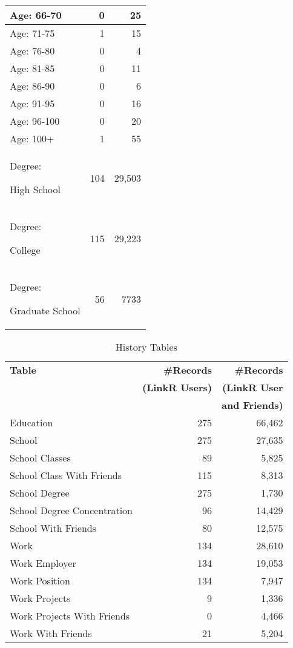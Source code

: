 \documentclass[letterpaper]{article}
\begin{document}
\begin{table}[h!]
\begin{tabular}{|>{\small}p{2cm}|>{\small}r|>{\small}r|}
\hline
Age: 66-70 & 0 & 25 \\
\hline
Age: 71-75 & 1 & 15 \\
\hline
Age: 76-80 & 0 & 4 \\
\hline
Age: 81-85 & 0 & 11 \\
\hline
Age: 86-90 & 0 & 6 \\
\hline
Age: 91-95 & 0 & 16 \\
\hline
Age: 96-100 & 0 & 20 \\
\hline
Age: 100+ & 1 & 55 \\
\hline
Degree:\par High School & 104 & 29,503 \\
\hline
Degree:\par College & 115 & 29,223 \\
\hline
Degree:\par Graduate School & 56 & 7733 \\
\hline
\end{tabular}
\end{table}




\begin{table}
\centering
\caption{\small History Tables}
\label{tab:history}
\begin{tabular}{|>{\small}p{2cm}|>{\small}r|>{\small}r|}
\hline
\textbf{Table} & \textbf{\#Records} & \textbf{\#Records} \\
& \textbf{(LinkR Users)} & \textbf{(LinkR User} \\
& & \textbf{and Friends)} \\
\hline
Education & 275 & 66,462 \\
\hline
School & 275 & 27,635 \\
\hline
School Classes & 89 & 5,825 \\
\hline
School Class With Friends & 115 & 8,313 \\
\hline
School Degree & 275 & 1,730 \\
\hline
School Degree Concentration & 96 & 14,429 \\
\hline
School With Friends & 80 & 12,575 \\
\hline
Work & 134 & 28,610 \\
\hline
Work Employer & 134 & 19,053 \\
\hline
Work Position & 134 & 7,947 \\
\hline
Work Projects & 9 & 1,336 \\
\hline
Work Projects With Friends & 0 & 4,466 \\
\hline
Work With Friends & 21 & 5,204 \\
\hline
\end{tabular}
\end{table}
\end{document}
